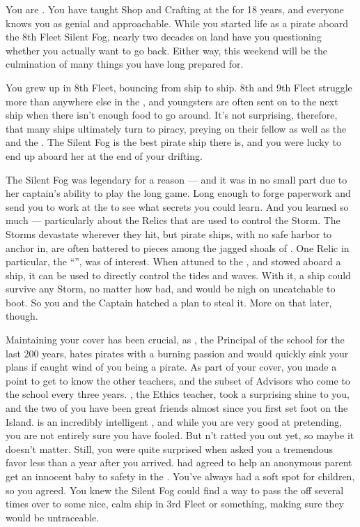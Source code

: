\documentclass[char]{GL2020}
\begin{document}
\name{\cPirate{}}

You are \cPirate{\intro}. You have taught Shop and Crafting at the \pSchool{} for 18 years, and everyone knows you as genial and approachable. While you started life as a pirate aboard the 8th Fleet Silent Fog, nearly two decades on land have you questioning whether you actually want to go back. Either way, this weekend will be the culmination of many things you have long prepared for.

You grew up in 8th Fleet, bouncing from ship to ship. 8th and 9th Fleet struggle more than anywhere else in the \pShip{}, and youngsters are often sent on to the next ship when there isn't enough food to go around. It's not surprising, therefore, that many ships ultimately turn to piracy, preying on their fellow \pShippies{} as well as the \pFarm{} and the \pTech{}. The Silent Fog is the best pirate ship there is, and you were lucky to end up aboard her at the end of your drifting.

The Silent Fog was legendary for a reason — and it was in no small part due to her captain's ability to play the long game. Long enough to forge paperwork and send you to work at the \pSchool{} to see what secrets you could learn. And you learned so much — particularly about the Relics that are used to control the Storm. The Storms devastate wherever they hit, but pirate ships, with no safe harbor to anchor in, are often battered to pieces among the jagged shoals of \pWod{}. One Relic in particular, the ``\iNet{}'', was of interest. When attuned to the \pShip{}, and stowed aboard a ship, it can be used to directly control the tides and waves. With it, a ship could survive any Storm, no matter how bad, and would be nigh on uncatchable to boot. So you and the Captain hatched a plan to steal it. More on that later, though.

Maintaining your cover has been crucial, as \cPrincipal{\full}, the Principal of the school for the last 200 years, hates pirates with a burning passion and would quickly sink your plans if \cPrincipal{\they} caught wind of you being a pirate. As part of your cover, you made a point to get to know the other teachers, and the subset of Advisors who come to the school every three years. \cEthics{\full}, the Ethics teacher, took a surprising shine to you, and the two of you have been great friends almost since you first set foot on the Island. \cEthics{} is an incredibly intelligent \cEthics{\person}, and while you are very good at pretending, you are not entirely sure you have \cEthics{\them} fooled. But \cEthics{\theyhave}n't ratted you out yet, so maybe it doesn't matter. Still, you were quite surprised when \cEthics{\they} asked you a tremendous favor less than a year after you arrived. \cEthics{} had agreed to help an anonymous parent get an innocent baby to safety in the \pShip{}. You've always had a soft spot for children, so you agreed. You knew the Silent Fog could find a way to pass the \cPirateChild{\child} off several times over to some nice, calm ship in 3rd Fleet or something, making sure they would be untraceable.
\end{document}
